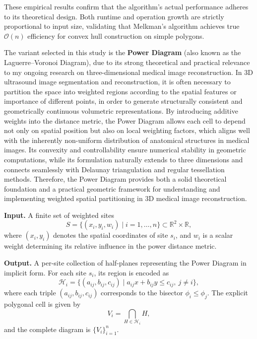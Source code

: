 \documentclass{article}
\begin{document}
These empirical results confirm that the algorithm’s actual performance adheres to its theoretical design.  
Both runtime and operation growth are strictly proportional to input size, validating that Melkman’s algorithm achieves true \(\mathcal{O}(n)\) efficiency for convex hull construction on simple polygons.

\setcounter{Psec}{0}
\setcounter{Psubsec}{0}

\newpage


The variant selected in this study is the \textbf{Power Diagram} (also known as the Laguerre–Voronoi Diagram), due to its strong theoretical and practical relevance to my ongoing research on three-dimensional medical image reconstruction.  
In 3D ultrasound image segmentation and reconstruction, it is often necessary to partition the space into weighted regions according to the spatial features or importance of different points, in order to generate structurally consistent and geometrically continuous volumetric representations.  
By introducing additive weights into the distance metric, the Power Diagram allows each cell to depend not only on spatial position but also on local weighting factors, which aligns well with the inherently non-uniform distribution of anatomical structures in medical images.  
Its convexity and controllability ensure numerical stability in geometric computations, while its formulation naturally extends to three dimensions and connects seamlessly with Delaunay triangulation and regular tessellation methods.  
Therefore, the Power Diagram provides both a solid theoretical foundation and a practical geometric framework for understanding and implementing weighted spatial partitioning in 3D medical image reconstruction.


\textbf{Input.}  
A finite set of weighted sites
\[
S = \{(x_i, y_i, w_i) \mid i = 1, \dots, n\} \subset \mathbb{R}^2 \times \mathbb{R},
\]
where $(x_i, y_i)$ denotes the spatial coordinates of site $s_i$, and $w_i$ is a scalar weight determining its relative influence in the power distance metric.

\textbf{Output.}  
A per-site collection of half-planes representing the Power Diagram in implicit form.  
For each site $s_i$, its region is encoded as
\[
\mathcal{H}_i = \{(a_{ij}, b_{ij}, c_{ij}) \mid a_{ij}x + b_{ij}y \le c_{ij},\ j \neq i\},
\]
where each triple $(a_{ij}, b_{ij}, c_{ij})$ corresponds to the bisector $\phi_i \le \phi_j$.  
The explicit polygonal cell is given by
\[
V_i = \bigcap_{H \in \mathcal{H}_i} H,
\]
and the complete diagram is $\{V_i\}_{i=1}^n$.
\end{document}
